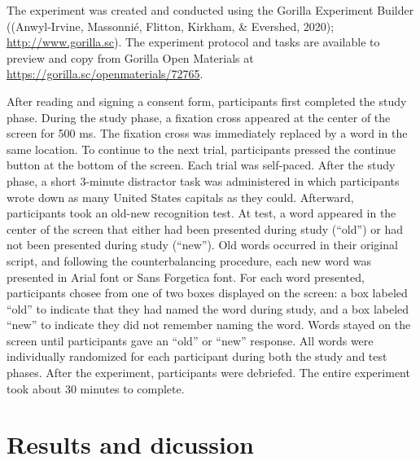 \documentclass[english,doc]{apa6}
\begin{document}
The experiment was created and conducted using the Gorilla Experiment Builder ((Anwyl-Irvine, Massonnié, Flitton, Kirkham, \& Evershed, 2020); \url{http://www.gorilla.sc}). The experiment protocol and tasks are available to preview and copy from Gorilla Open Materials at \url{https://gorilla.sc/openmaterials/72765}.

After reading and signing a consent form, participants first completed the study phase. During the study phase, a fixation cross appeared at the center of the screen for 500 ms. The fixation cross was immediately replaced by a word in the same location. To continue to the next trial, participants pressed the continue button at the bottom of the screen. Each trial was self-paced. After the study phase, a short 3-minute distractor task was administered in which participants wrote down as many United States capitals as they could. Afterward, participants took an old-new recognition test. At test, a word appeared in the center of the screen that either had been presented during study (\enquote{old}) or had not been presented during study (\enquote{new}). Old words occurred in their original script, and following the counterbalancing procedure, each new word was presented in Arial font or Sans Forgetica font. For each word presented, participants chosee from one of two boxes displayed on the screen: a box labeled \enquote{old} to indicate that they had named the word during study, and a box labeled \enquote{new} to indicate they did not remember naming the word. Words stayed on the screen until participants gave an \enquote{old} or \enquote{new} response. All words were individually randomized for each participant during both the study and test phases. After the experiment, participants were debriefed. The entire experiment took about 30 minutes to complete.

\hypertarget{results-and-dicussion}{%
\section{Results and dicussion}\label{results-and-dicussion}}
\end{document}
